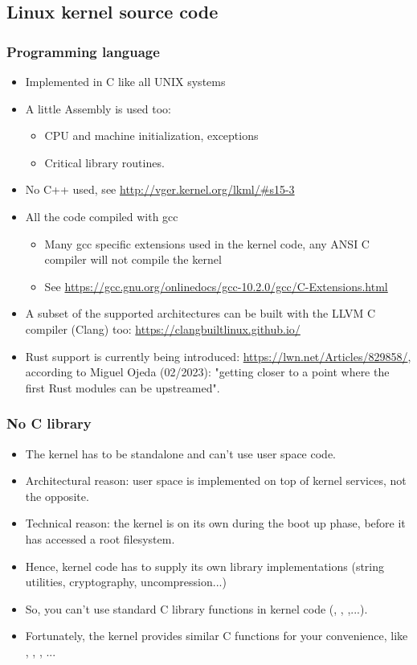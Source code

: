 \subsection{Linux kernel source code}

\begin{frame}
  \frametitle{Programming language}
  \begin{itemize}
  \item Implemented in C like all UNIX systems
  \item A little Assembly is used too:
    \begin{itemize}
    \item CPU and machine initialization, exceptions
    \item Critical library routines.
    \end{itemize}
  \item No C++ used, see \url{http://vger.kernel.org/lkml/\#s15-3}
  \item All the code compiled with gcc
    \begin{itemize}
    \item Many gcc specific extensions used in the kernel code, any
      ANSI C compiler will not compile the kernel
    \item See
      \url{https://gcc.gnu.org/onlinedocs/gcc-10.2.0/gcc/C-Extensions.html}
    \end{itemize}
    \item A subset of the supported architectures can be built with the
      LLVM C compiler (Clang) too: \url{https://clangbuiltlinux.github.io/}
    \item Rust support is currently being introduced:
      \url{https://lwn.net/Articles/829858/}, according to Miguel Ojeda
      (02/2023): "getting closer to a point where the first Rust modules
      can be upstreamed".
  \end{itemize}
\end{frame}


\begin{frame}
  \frametitle{No C library}
  \begin{itemize}
  \item The kernel has to be standalone and can't use user space code.
  \item Architectural reason: user space is implemented on top of kernel services, not the
    opposite.
  \item Technical reason: the kernel is on its own during the boot up
    phase, before it has accessed a root filesystem.
  \item Hence, kernel code has to supply its own library implementations
    (string utilities, cryptography, uncompression...)
  \item So, you can't use standard C library functions in kernel code
    (, , ,...).
  \item Fortunately, the kernel provides similar C functions for your
    convenience, like , ,
    , ...
  \end{itemize}
\end{frame}

